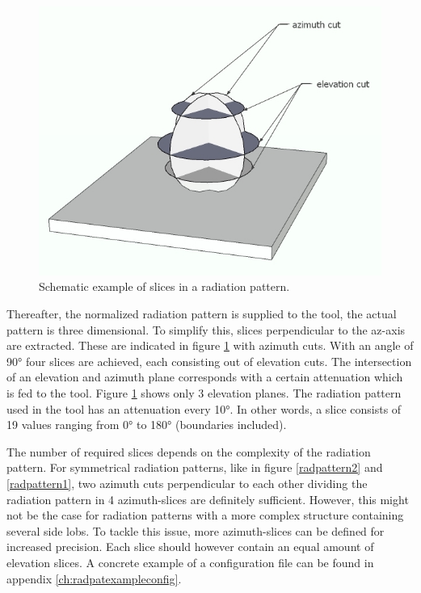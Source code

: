 \begin{figure}[H]
\centering
  \includegraphics[width=\textwidth/10*7]{../images/3Dimages/slicesOfPattern.jpg}
  \caption{Schematic example of slices in a radiation pattern.}
  \label{fig:slicesOfPattern}
\end{figure}

Thereafter, the normalized radiation pattern is supplied to the tool, the actual pattern is three dimensional. To simplify this,
slices perpendicular to the az-axis are extracted. These are indicated in figure \ref{fig:slicesOfPattern} with azimuth cuts. With
an angle of \ang{90} four slices are achieved, each consisting out of elevation cuts. The intersection of an elevation and azimuth plane 
corresponds with a certain attenuation which is fed to the tool. Figure \ref{fig:slicesOfPattern} shows only 3 elevation planes. The radiation pattern used in the tool 
has an attenuation every \ang{10}. In other words, a slice consists of 19 values ranging from \ang{0} to \ang{180} (boundaries included).

The number of required slices depends on the complexity of the radiation pattern. For symmetrical radiation patterns, like 
in figure \ref{radpattern2} and \ref{radpattern1}, two azimuth cuts perpendicular to each other dividing the radiation pattern in 4 azimuth-slices 
are definitely sufficient. However, this might not be the case for radiation patterns with a more complex structure containing several  
side lobs. To tackle this issue, more azimuth-slices can be defined for increased precision. Each slice should however contain an equal amount 
of elevation slices.  A concrete example of a configuration file can be found in appendix \ref{ch:radpatexampleconfig}.
 
